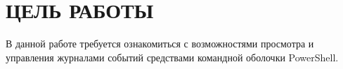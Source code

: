 \section{ЦЕЛЬ РАБОТЫ}

В данной работе требуется ознакомиться с возможностями просмотра и управления
журналами событий средствами командной оболочки PowerShell.

\newpage
